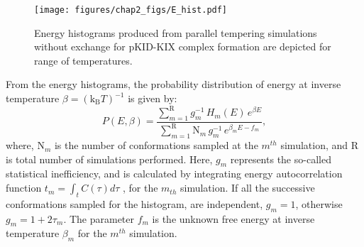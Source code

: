 \documentclass[../talant.diss.submit.tex]{subfiles}
\begin{document}
% 
%
%
%
%
%
\begin{figure}[htp!]
  \begin{centering}
    \texttt{[image: figures/chap2\_figs/E\_hist.pdf]}
    \caption{Energy histograms produced from parallel tempering simulations without exchange
      for pKID-KIX complex formation are depicted for range of temperatures.}
    \label{fig:EHist}
  \end{centering}
\end{figure}
%
%

From the energy histograms, the probability distribution of energy at inverse temperature
$\beta = (\mathrm{k_{B}}T)^{-1}$ is given by: 
\begin{equation}
    \label{eq:H_E}
    P(E,\beta) = \frac{\sum\limits_{m=1}^{\mathrm{R}}{g_{m}^{-1} \, H_{m}(E) \,
        e^{\beta E}}}{\sum\limits_{m=1}^{\mathrm{R}}{\mathrm{N}_m \, g_{m}^{-1} \, e^{\beta_{m} E - f_{m}}}},
\end{equation}
where, $\mathrm{N}_m$ is the number of conformations sampled at the $m^{th}$
simulation, and R is total number of simulations performed. Here, $g_m$
represents the so-called statistical inefficiency, and is calculated by
integrating energy autocorrelation function $t_m = \int_{t} C(\tau)d\tau$ , for
the $m_{th}$ simulation. If all the successive conformations sampled for the
histogram, are independent, $g_m = 1$, otherwise $g_m = 1 + 2\tau_m$. The parameter
$f_m$ is the unknown free energy at inverse temperature $\beta_m$ for the $m^{th}$ simulation.
\end{document}
